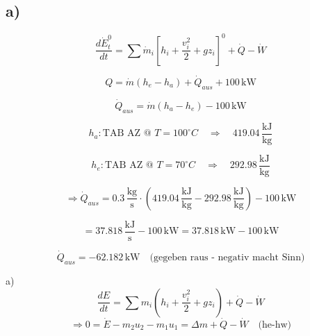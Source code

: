 

\subsection*{a)}

\begin{equation*}
\frac{d\dot{E}_t^0}{dt} = \sum \dot{m}_i \left[ h_i + \frac{v_i^2}{2} + g z_i \right]^0 + \dot{Q} - \dot{W}
\end{equation*}

\begin{equation*}
Q = \dot{m} (h_e - h_a) + \dot{Q}_{aus} + 100 \, \text{kW}
\end{equation*}

\begin{equation*}
\dot{Q}_{aus} = \dot{m} (h_a - h_e) - 100 \, \text{kW}
\end{equation*}

\begin{equation*}
h_a: \text{TAB AZ @ } T = 100^\circ C \quad \Rightarrow \quad 419.04 \, \frac{\text{kJ}}{\text{kg}}
\end{equation*}

\begin{equation*}
h_e: \text{TAB AZ @ } T = 70^\circ C \quad \Rightarrow \quad 292.98 \, \frac{\text{kJ}}{\text{kg}}
\end{equation*}

\begin{equation*}
\Rightarrow \dot{Q}_{aus} = 0.3 \, \frac{\text{kg}}{\text{s}} \cdot (419.04 \, \frac{\text{kJ}}{\text{kg}} - 292.98 \, \frac{\text{kJ}}{\text{kg}}) - 100 \, \text{kW}
\end{equation*}

\begin{equation*}
= 37.818 \, \frac{\text{kJ}}{\text{s}} - 100 \, \text{kW} = 37.818 \, \text{kW} - 100 \, \text{kW}
\end{equation*}

\begin{equation*}
\dot{Q}_{aus} = -62.182 \, \text{kW} \quad \text{(gegeben raus - negativ macht Sinn)}
\end{equation*}

a)
\[
\frac{dE}{dt} = \sum m_i \left( h_i + \frac{v_i^2}{2} + gz_i \right) + \dot{Q} - \dot{W}
\]
\[
\Rightarrow 0 = \dot{E} - m_2 u_2 - m_1 u_1 = \Delta m + \dot{Q} - \dot{W} \quad \text{(he-hw)}
\]